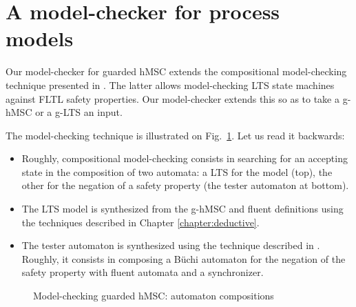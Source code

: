 \section{A model-checker for process models\label{section:tool-model-checker}}

Our model-checker for guarded hMSC extends the compositional model-checking technique presented in \cite{Giannakopoulou:2003}. The latter allows model-checking LTS state machines against FLTL safety properties. Our model-checker extends this so as to take a g-hMSC or a g-LTS an input. 

The model-checking technique is illustrated on Fig.~\ref{image:model-checking-technique}. Let us read it backwards:
\begin{itemize}
\item Roughly, compositional model-checking consists in searching for an accepting state in the composition of two automata: a LTS for the model (top), the other for the negation of a safety property (the tester automaton at bottom).
\item The LTS model is synthesized from the g-hMSC and fluent definitions using the techniques described in Chapter \ref{chapter:deductive}.
\item The tester automaton is synthesized using the technique described in \cite{Giannakopoulou:2003}. Roughly, it consists in composing a B\"uchi automaton for the negation of the safety property with fluent automata and a synchronizer. 
\end{itemize} 

\begin{figure}
\centering{}
  \caption{Model-checking guarded hMSC: automaton compositions\label{image:model-checking-technique}}
\end{figure}

